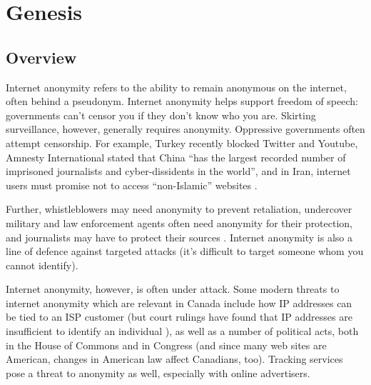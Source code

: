 \documentclass[12pt,a4paper]{article}
\begin{document}
\setcounter{tocdepth}{2}
\tableofcontents
\clearpage

\pagestyle{fancy}
\fancyhf{} %
\renewcommand{\headrulewidth}{0pt} %

\section{Genesis}
\subsection{Overview}
Internet anonymity refers to the ability to remain anonymous on the internet, often behind a pseudonym. Internet anonymity helps support freedom of speech: governments can't censor you if they don't know who you are. Skirting surveillance, however, generally requires anonymity. Oppressive governments often attempt censorship. For example, Turkey recently blocked Twitter and Youtube, Amnesty International stated that China ``has the largest recorded number of imprisoned journalists and cyber-dissidents in the world'', and in Iran, internet users must promise not to access ``non-Islamic'' websites \cite{anon}.

Further, whistleblowers may need anonymity to prevent retaliation, undercover military and law enforcement agents often need anonymity for their protection, and journalists may have to protect their sources \cite{toranon}. Internet anonymity is also a line of defence against targeted attacks (it's difficult to target someone whom you cannot identify).

Internet anonymity, however, is often under attack. Some modern threats to internet anonymity which are relevant in Canada include how IP addresses can be tied to an ISP customer (but court rulings have found that IP addresses are insufficient to identify an individual \cite{ipnotpeople}), as well as a number of political acts, both in the House of Commons and in Congress (and since many web sites are American, changes in American law affect Canadians, too). Tracking services pose a threat to anonymity as well, especially with online advertisers.
\end{document}
